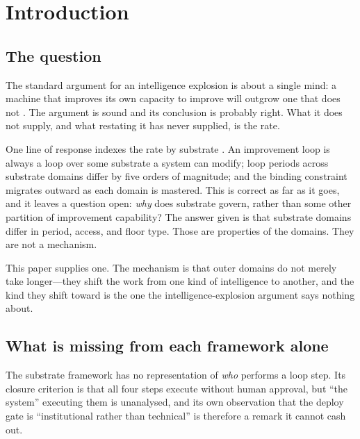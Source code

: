 \documentclass[11pt]{article}
\begin{document}
\begin{abstract}
The crossing also explains four things the substrate framework observes without accounting for: why its design-to-deploy gap appears in every domain, why its own timeline errors were monotonic in distance from software, what a compensated half-loop is structurally, and how to weight loop completion so that two systems with the same score become distinguishable.
\end{abstract}

\tableofcontents
\bigskip

\section{Introduction}

\subsection{The question}

The standard argument for an intelligence explosion is about a single mind: a machine that improves its own capacity to improve will outgrow one that does not \citep{good1965speculations}. The argument is sound and its conclusion is probably right. What it does not supply, and what restating it has never supplied, is the rate.

One line of response indexes the rate by substrate \citep{yang2026sarsil}. An improvement loop is always a loop over some substrate a system can modify; loop periods across substrate domains differ by five orders of magnitude; and the binding constraint migrates outward as each domain is mastered. This is correct as far as it goes, and it leaves a question open: \emph{why} does substrate govern, rather than some other partition of improvement capability? The answer given is that substrate domains differ in period, access, and floor type. Those are properties of the domains. They are not a mechanism.

This paper supplies one. The mechanism is that outer domains do not merely take longer---they shift the work from one kind of intelligence to another, and the kind they shift toward is the one the intelligence-explosion argument says nothing about.

\subsection{What is missing from each framework alone}

The substrate framework has no representation of \emph{who} performs a loop step. Its closure criterion is that all four steps execute without human approval, but ``the system'' executing them is unanalysed, and its own observation that the deploy gate is ``institutional rather than technical'' is therefore a remark it cannot cash out.
\end{document}
